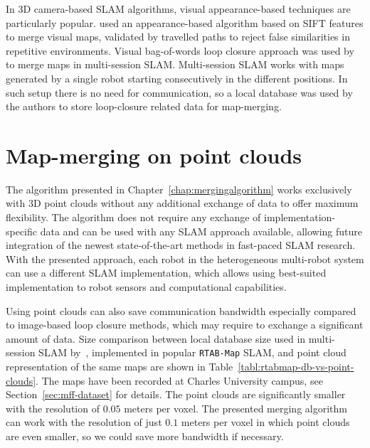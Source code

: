 In \gls{3D} camera-based \gls{SLAM} algorithms, visual appearance-based techniques are particularly popular. \citet{tomono2013merging} used an appearance-based algorithm based on \gls{SIFT} features to merge visual maps, validated by travelled paths to reject false similarities in repetitive environments. Visual bag-of-words loop closure approach was used by~\citet{labbe2014online} to merge maps in multi-session \gls{SLAM}. Multi-session \gls{SLAM} works with maps generated by a single robot starting consecutively in the different positions. In such setup there is no need for communication, so a local database was used by the authors to store loop-closure related data for map-merging.

\section{Map-merging on point clouds}
\label{sec:map-merging-on-point-clouds}

The algorithm presented in Chapter~\ref{chap:mergingalgorithm} works exclusively with \gls{3D} point clouds without any additional exchange of data to offer maximum flexibility. The algorithm does not require any exchange of implementation-specific data and can be used with any \gls{SLAM} approach available, allowing future integration of the newest state-of-the-art methods in fast-paced \gls{SLAM} research. With the presented approach, each robot in the heterogeneous multi-robot system can use a different \gls{SLAM} implementation, which allows using best-suited implementation to robot sensors and computational capabilities.

Using point clouds can also save communication bandwidth especially compared to image-based loop closure methods, which may require to exchange a significant amount of data. Size comparison between local database size used in multi-session \gls{SLAM} by~\citet{labbe2014online}, implemented in popular \texttt{RTAB-Map} \gls{SLAM}, and point cloud representation of the same maps are shown in Table~\ref{tabl:rtabmap-db-vs-point-clouds}. The maps have been recorded at Charles University campus, see Section~\ref{sec:mff-dataset} for details. The point clouds are significantly smaller with the resolution of $0.05$ meters per voxel. The presented merging algorithm can work with the resolution of just $0.1$ meters per voxel in which point clouds are even smaller, so we could save more bandwidth if necessary.

